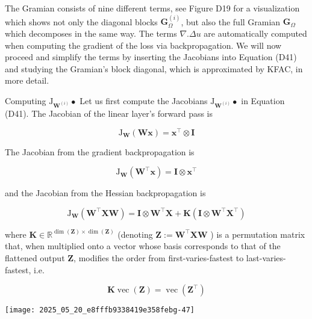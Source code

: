 \documentclass[10pt]{article}
\begin{document}
The Gramian consists of nine different terms, see Figure D19 for a visualization which shows not only the diagonal blocks $\boldsymbol{G}_{\Omega}^{(i)}$, but also the full Gramian $\boldsymbol{G}_{\Omega}$ which decomposes in the same way. The terms $\nabla . \Delta u$ are automatically computed when computing the gradient of the loss via backpropagation. We will now proceed and simplify the terms by inserting the Jacobians into Equation (D41) and studying the Gramian's block diagonal, which is approximated by KFAC, in more detail.

Computing $\mathrm{J}_{\boldsymbol{W}^{(i)}} \bullet$ Let us first compute the Jacobians $\mathrm{J}_{\boldsymbol{W}^{(i)}} \bullet$ in Equation (D41). The Jacobian of the linear layer's forward pass is


\begin{equation*}
\mathrm{J}_{\boldsymbol{W}}(\boldsymbol{W} \boldsymbol{x})=\boldsymbol{x}^{\top} \otimes \boldsymbol{I} \tag{D43a}
\end{equation*}


The Jacobian from the gradient backpropagation is


\begin{equation*}
\mathrm{J}_{\boldsymbol{W}}\left(\boldsymbol{W}^{\top} \boldsymbol{x}\right)=\boldsymbol{I} \otimes \boldsymbol{x}^{\top} \tag{D43b}
\end{equation*}


and the Jacobian from the Hessian backpropagation is


\begin{equation*}
\mathrm{J}_{\boldsymbol{W}}\left(\boldsymbol{W}^{\top} \boldsymbol{X} \boldsymbol{W}\right)=\boldsymbol{I} \otimes \boldsymbol{W}^{\top} \boldsymbol{X}+\boldsymbol{K}\left(\boldsymbol{I} \otimes \boldsymbol{W}^{\top} \boldsymbol{X}^{\top}\right) \tag{D43c}
\end{equation*}


where $\boldsymbol{K} \in \mathbb{R}^{\operatorname{dim}(\boldsymbol{Z}) \times \operatorname{dim}(\boldsymbol{Z})}$ (denoting $\boldsymbol{Z}:=\boldsymbol{W}^{\top} \boldsymbol{X} \boldsymbol{W}$ ) is a permutation matrix that, when multiplied onto a vector whose basis corresponds to that of the flattened output $\boldsymbol{Z}$, modifies the order from first-varies-fastest to last-varies-fastest, i.e.

$$
\boldsymbol{K} \operatorname{vec}(\boldsymbol{Z})=\operatorname{vec}\left(\boldsymbol{Z}^{\top}\right)
$$

\begin{center}
\texttt{[image: 2025\_05\_20\_e8fffb9338419e358febg-47]}
\end{center}
\end{document}
